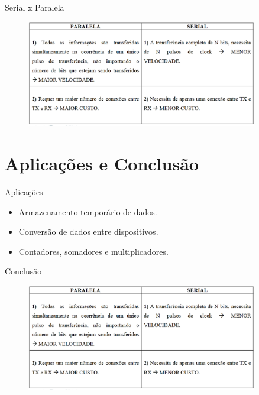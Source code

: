 \documentclass{beamer}
\begin{document}
\begin{frame}{Serial x Paralela
 }

\begin{figure}
\centering
\includegraphics[width=0.9\textwidth]{figures/serial_paralela.png}
\end{figure}


\end{frame}


\section{Aplicações e Conclusão}

\begin{frame}{Aplicações}
\begin{itemize}
    \item Armazenamento temporário de dados.
    \item Conversão de dados entre dispositivos.
    \item Contadores, somadores e multiplicadores.
\end{itemize}
\end{frame}

\begin{frame}{Conclusão}
\begin{figure}
\centering
\includegraphics[width=0.9\textwidth]{figures/serial_paralela.png}
\end{figure}
\end{frame}
\end{document}
